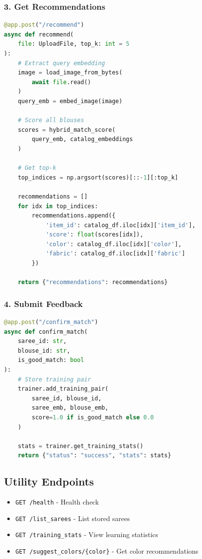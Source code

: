 \documentclass[12pt,a4paper]{report}
\begin{document}
\subsubsection{3. Get Recommendations}

\begin{lstlisting}[language=Python]
@app.post("/recommend")
async def recommend(
    file: UploadFile, top_k: int = 5
):
    # Extract query embedding
    image = load_image_from_bytes(
        await file.read()
    )
    query_emb = embed_image(image)
    
    # Score all blouses
    scores = hybrid_match_score(
        query_emb, catalog_embeddings
    )
    
    # Get top-k
    top_indices = np.argsort(scores)[::-1][:top_k]
    
    recommendations = []
    for idx in top_indices:
        recommendations.append({
            'item_id': catalog_df.iloc[idx]['item_id'],
            'score': float(scores[idx]),
            'color': catalog_df.iloc[idx]['color'],
            'fabric': catalog_df.iloc[idx]['fabric']
        })
    
    return {"recommendations": recommendations}
\end{lstlisting}

\subsubsection{4. Submit Feedback}

\begin{lstlisting}[language=Python]
@app.post("/confirm_match")
async def confirm_match(
    saree_id: str,
    blouse_id: str,
    is_good_match: bool
):
    # Store training pair
    trainer.add_training_pair(
        saree_id, blouse_id,
        saree_emb, blouse_emb,
        score=1.0 if is_good_match else 0.0
    )
    
    stats = trainer.get_training_stats()
    return {"status": "success", "stats": stats}
\end{lstlisting}

\subsection{Utility Endpoints}

\begin{itemize}
    \item \texttt{GET /health} - Health check
    \item \texttt{GET /list\_sarees} - List stored sarees
    \item \texttt{GET /training\_stats} - View learning statistics
    \item \texttt{GET /suggest\_colors/\{color\}} - Get color recommendations
\end{itemize}
\end{document}
